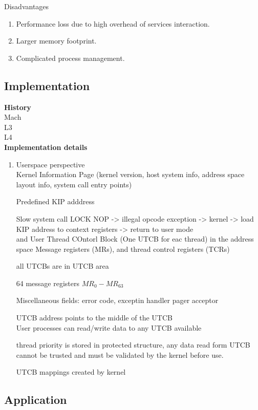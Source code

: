 \documentclass{article}
\begin{document}
    Disadvantages
    \begin{enumerate}[-, leftmargin = 0.7cm, nosep]
    \item Performance loss due to high overhead of services interaction.
    \item Larger memory footprint.
    \item Complicated process management.
    \end{enumerate}

    \subsection{Implementation}
    \textbf{History}\\

    Mach\\

    L3\\

    L4\\

    \textbf{Implementation details}
    \begin{enumerate}[-, leftmargin = 0.7cm, nosep]
    \item Userspace perspective \\
        Kernel Information Page (kernel version, host system info, address space layout
        info, system call entry points)
        
        Predefined KIP adddress

        Slow system call LOCK NOP -> illegal opcode exception -> kernel -> load KIP address
        to context registers -> return to user mode
        \\ 
        and User Thread COntorl Block (One UTCB for eac thread) in the address space
         Message registers (MRs), and thread control registers (TCRs) 

         all UTCBs are in UTCB area

         64 message registers $MR_0 - MR_63$

         Miscellaneous fields: error code, exceptin handler pager acceptor
         
         UTCB address  points to the middle of the UTCB \\

         User processes can read/write data to any UTCB available

         thread priority is stored in protected structure, any data read form UTCB cannot be
         trusted and must  be validated by the kernel before use.

         UTCB mappings created by kernel



    \end{enumerate}



    \subsection{Application}
    
\end{document}
